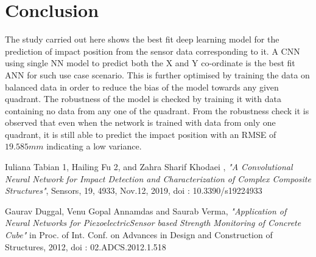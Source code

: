 \documentclass[12pt]{article}
\begin{document}
\section{Conclusion}

The study carried out here shows the best fit deep learning model for the prediction of impact position from the sensor data corresponding to it. A CNN using single NN model to predict both the X and Y co-ordinate is the best fit ANN for such use case scenario. This is further optimised by training the data on balanced data in order to reduce the bias of the model towards any given quadrant. The robustness of the model is checked by training it with data containing no data from any one of the quadrant. From the robustness check it is observed that even when the network is trained with data from only one quadrant, it is still able to predict the impact position with an RMSE of $19.585 mm$ indicating a low variance.   

\begin{thebibliography}{9}
Iuliana Tabian 1, Hailing Fu 2, and Zahra Sharif Khodaei , \emph{"A Convolutional Neural Network for Impact Detection and
Characterization of Complex Composite Structures"}, Sensors, 19, 4933, Nov.12, 2019, doi : 10.3390/s19224933

Gaurav Duggal, Venu Gopal Annamdas and Saurab Verma, \emph{"Application of Neural Networks for PiezoelectricSensor
based Strength Monitoring of Concrete Cube"} in Proc. of Int. Conf. on Advances in Design and Construction of Structures,
2012, doi : 02.ADCS.2012.1.518
\end{thebibliography}
 
\end{document}

